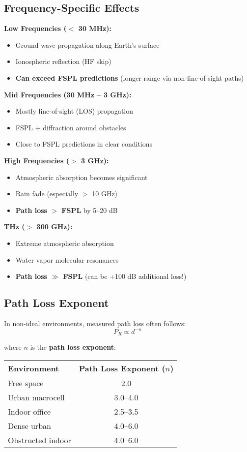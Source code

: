 \subsection{Frequency-Specific Effects}

\textbf{Low Frequencies ($<$ 30 MHz):}
\begin{itemize}
\item Ground wave propagation along Earth's surface
\item Ionospheric reflection (HF skip)
\item \textbf{Can exceed FSPL predictions} (longer range via non-line-of-sight paths)
\end{itemize}

\textbf{Mid Frequencies (30 MHz -- 3 GHz):}
\begin{itemize}
\item Mostly line-of-sight (LOS) propagation
\item FSPL + diffraction around obstacles
\item Close to FSPL predictions in clear conditions
\end{itemize}

\textbf{High Frequencies ($>$ 3 GHz):}
\begin{itemize}
\item Atmospheric absorption becomes significant
\item Rain fade (especially $>$ 10 GHz)
\item \textbf{Path loss $>$ FSPL} by 5--20 dB
\end{itemize}

\textbf{THz ($>$ 300 GHz):}
\begin{itemize}
\item Extreme atmospheric absorption
\item Water vapor molecular resonances
\item \textbf{Path loss $\gg$ FSPL} (can be +100 dB additional loss!)
\end{itemize}

\subsection{Path Loss Exponent}

In non-ideal environments, measured path loss often follows:
\begin{equation}
P_R \propto d^{-n}
\label{eq:path-loss-exponent}
\end{equation}

where $n$ is the \textbf{path loss exponent}:
\begin{center}
\begin{tabular}{@{}lc@{}}
\toprule
\textbf{Environment} & \textbf{Path Loss Exponent ($n$)} \\
\midrule
Free space & 2.0 \\
Urban macrocell & 3.0--4.0 \\
Indoor office & 2.5--3.5 \\
Dense urban & 4.0--6.0 \\
Obstructed indoor & 4.0--6.0 \\
\bottomrule
\end{tabular}
\end{center}

